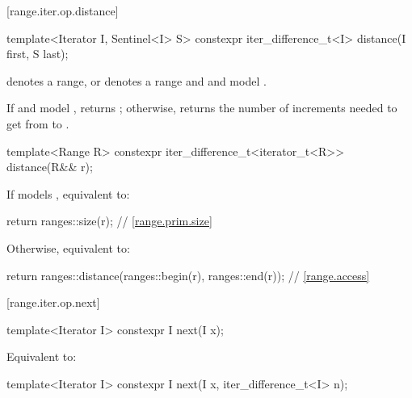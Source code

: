 [range.iter.op.distance]{}
%
\begin{itemdecl}
template<Iterator I, Sentinel<I> S>
  constexpr iter_difference_t<I> distance(I first, S last);
\end{itemdecl}

\begin{itemdescr}
\pnum
\expects
{} denotes a range, or
 denotes a range and
 and  model
.

\pnum
\effects
If  and  model ,
returns ;
otherwise, returns the number of increments needed to get from
to
.
\end{itemdescr}

%
\begin{itemdecl}
template<Range R>
  constexpr iter_difference_t<iterator_t<R>> distance(R&& r);
\end{itemdecl}

\begin{itemdescr}
\pnum
\effects
If  models , equivalent to:
\begin{codeblock}
return ranges::size(r);                                         // \ref{range.prim.size}
\end{codeblock}
Otherwise, equivalent to:
\begin{codeblock}
return ranges::distance(ranges::begin(r), ranges::end(r));      // \ref{range.access}
\end{codeblock}
\end{itemdescr}

[range.iter.op.next]{}

%
\begin{itemdecl}
template<Iterator I>
  constexpr I next(I x);
\end{itemdecl}

\begin{itemdescr}
\pnum
\effects Equivalent to: 
\end{itemdescr}

%
\begin{itemdecl}
template<Iterator I>
  constexpr I next(I x, iter_difference_t<I> n);
\end{itemdecl}


